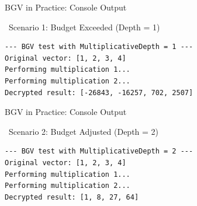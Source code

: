 \documentclass[aspectratio=169, 10pt]{beamer}
\begin{document}
\begin{frame}[fragile]{BGV in Practice: Console Output}
\vspace{0.1cm}

\begin{alertblock}{\faExclamationTriangle \ Scenario 1: Budget Exceeded (Depth = 1)}
\begin{lstlisting}[language={}, basicstyle=\ttfamily\small\color{white}, backgroundcolor=\color{black!85}, numbers=none]
--- BGV test with MultiplicativeDepth = 1 ---
Original vector: [1, 2, 3, 4]
Performing multiplication 1...
Performing multiplication 2...
Decrypted result: [-26843, -16257, 702, 2507]
\end{lstlisting}
\end{alertblock}
\end{frame}

\begin{frame}[fragile]{BGV in Practice: Console Output}
\vspace{0.1cm}

\begin{exampleblock}{\faCheckCircle \ Scenario 2: Budget Adjusted (Depth = 2)}
\begin{lstlisting}[language={}, basicstyle=\ttfamily\small\color{white}, backgroundcolor=\color{black!85}, numbers=none]
--- BGV test with MultiplicativeDepth = 2 ---
Original vector: [1, 2, 3, 4]
Performing multiplication 1...
Performing multiplication 2...
Decrypted result: [1, 8, 27, 64]
\end{lstlisting}
\end{exampleblock}

\end{frame}
\end{document}
